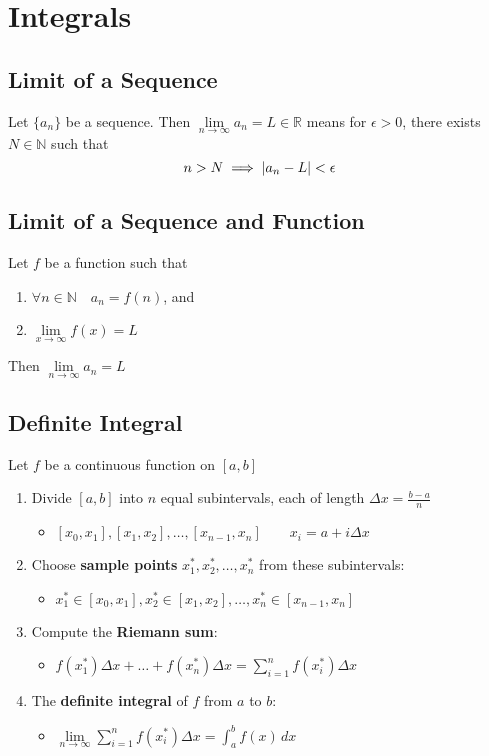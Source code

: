 \documentclass[../ma2002_notes.tex]{subfiles}
\begin{document}
\section{Integrals}
\subsection{Limit of a Sequence}
Let \(\{a_n\}\) be a sequence. Then \(\lim\limits_{n\to\infty}a_n=L\in\mathbb{R}\) means for \(\epsilon>0\), there exists \(N\in\mathbb{N}\) such that
\[n>N\implies\lvert a_n-L\rvert<\epsilon\]

\subsection{Limit of a Sequence and Function}
Let \(f\) be a function such that
\begin{enumerate}
	\item\(\forall n\in\mathbb{N}\quad a_n=f(n)\), and
	\item\(\lim\limits_{x\to\infty}f(x)=L\)
\end{enumerate}
Then \(\lim\limits_{n\to\infty}a_n=L\)

\subsection{Definite Integral}
Let \(f\) be a continuous function on \([a,b]\)
\begin{enumerate}
	\item Divide \([a,b]\) into \(n\) equal subintervals, each of length \(\Delta x=\frac{b-a}{n}\)
	\begin{itemize}
		\item\([x_0,x_1],[x_1,x_2],\ldots,[x_{n-1},x_n]\qquad x_i=a+i\Delta x\)
	\end{itemize}
	\item Choose \textbf{sample points} \(x_1^*,x_2^*,\ldots,x_n^*\) from these subintervals:
	\begin{itemize}
		\item\(x_1^*\in[x_0,x_1],x_2^*\in[x_1,x_2],\ldots,x_n^*\in[x_{n-1},x_n]\)
	\end{itemize}
	\item Compute the \textbf{Riemann sum}:
	\begin{itemize}
		\item\(f(x_1^*)\Delta x+\ldots+f(x_n^*)\Delta x=\sum\limits_{i=1}^{n}f(x_i^*)\Delta x\)
	\end{itemize}
	\item The \textbf{definite integral} of \(f\) from \(a\) to \(b\):
	\begin{itemize}
		\item\(\lim\limits_{n\to\infty}\sum\limits_{i=1}^nf(x_i^*)\Delta x=\int_a^bf(x)\,dx\)
	\end{itemize}
\end{enumerate}
\end{document}

